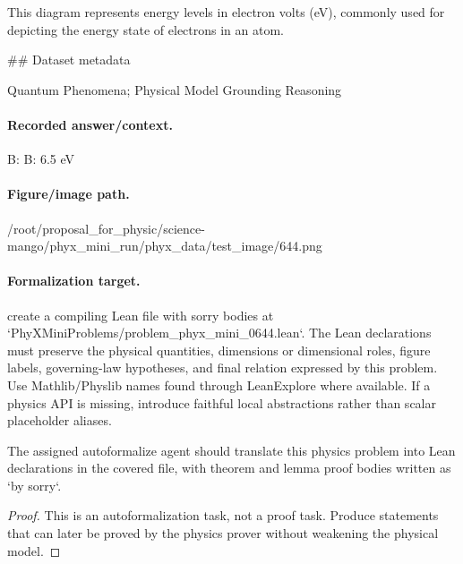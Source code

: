 This diagram represents energy levels in electron volts (eV), commonly used for depicting the energy state of electrons in an atom.

\#\# Dataset metadata

Quantum Phenomena; Physical Model Grounding Reasoning

\paragraph{Recorded answer/context.}
B: B: 6.5 eV

\paragraph{Figure/image path.}
/root/proposal\_for\_physic/science-mango/phyx\_mini\_run/phyx\_data/test\_image/644.png

\paragraph{Formalization target.}
create a compiling Lean file with sorry bodies at `PhyXMiniProblems/problem\_phyx\_mini\_0644.lean`. The Lean declarations must preserve the physical quantities, dimensions or dimensional roles, figure labels, governing-law hypotheses, and final relation expressed by this problem.
Use Mathlib/Physlib names found through LeanExplore where available. If a physics API is missing, introduce faithful local abstractions rather than scalar placeholder aliases.

\begin{theorem}
\label{thm:physics:phyx_mini_0644:target}
The assigned autoformalize agent should translate this physics problem into Lean declarations in the covered file, with theorem and lemma proof bodies written as `by sorry`.
\end{theorem}
\begin{proof}
This is an autoformalization task, not a proof task. Produce statements that can later be proved by the physics prover without weakening the physical model.
\end{proof}

